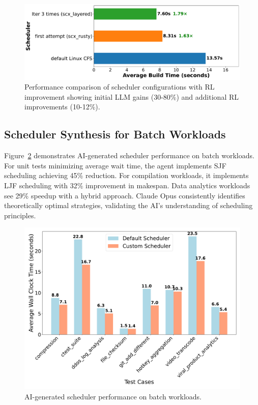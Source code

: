 \begin{figure}[h]
\centering
\includegraphics[width=0.9\columnwidth]{sections/Linux_build_benchmark_results.pdf}
\caption{Performance comparison of scheduler configurations with RL improvement showing initial LLM gains (30-80\%) and additional RL improvements (10-12\%).}
\label{fig:performance-comparison}
\end{figure}

\subsection{Scheduler Synthesis for Batch Workloads}

Figure~\ref{fig:batch-performance} demonstrates AI-generated scheduler performance on batch workloads. For unit tests minimizing average wait time, the agent implements SJF scheduling achieving 45\% reduction. For compilation workloads, it implements LJF scheduling with 32\% improvement in makespan. Data analytics workloads see 29\% speedup with a hybrid approach. Claude Opus consistently identifies theoretically optimal strategies, validating the AI's understanding of scheduling principles.

\begin{figure}[h]
\centering
\includegraphics[width=0.9\columnwidth]{sections/scheduler_performance_comparison.pdf}
\caption{AI-generated scheduler performance on batch workloads.}
\label{fig:batch-performance}
\end{figure}

